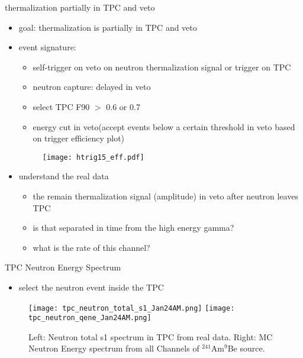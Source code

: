 \documentclass[9pt]{beamer}
\begin{document}
\begin{frame}{thermalization partially in TPC and veto}
\begin{itemize}
[bullet]
\item goal: thermalization is partially in TPC and veto
\item event signature:
	\begin{itemize}
	[default]
	\item self-trigger on veto on neutron thermalization signal or trigger on TPC
	\item neutron capture: delayed in veto
	\item select TPC F90 $>$ 0.6 or 0.7
	\item energy cut in veto(accept events below a certain threshold in veto based on trigger efficiency plot)	
	\end{itemize}
\begin{figure}
\texttt{[image: htrig15\_eff.pdf]}
\end{figure}
\item understand the real data
	\begin{itemize}
	[default]
	\item the remain thermalization signal (amplitude) in veto after neutron leaves TPC
	\item is that separated in time from the high energy gamma?
	\item what is the rate of this channel?
	\end{itemize}
\end{itemize} 
\end{frame}

\begin{frame}{TPC Neutron Energy Spectrum}
\begin{itemize}
[bullet]
\item select the neutron event inside the TPC 
\end{itemize}
\begin{figure}
\texttt{[image: tpc\_neutron\_total\_s1\_Jan24AM.png]}
\texttt{[image: tpc\_neutron\_qene\_Jan24AM.png]}
\caption{Left: Neutron total s1 spectrum in TPC from real data. Right: MC Neutron Energy spectrum from all Channels  of $^{241}$Am$^9$Be source.}
\end{figure}
\end{frame}
\end{document}
